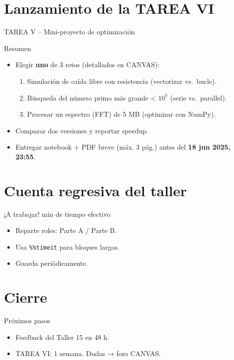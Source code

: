 \documentclass[10pt]{beamer}
\begin{document}
\section{Lanzamiento de la TAREA VI}
\begin{frame}{TAREA V -- Mini-proyecto de optimización}
\begin{block}{Resumen}
  \begin{itemize}
    \item Elegir \textbf{uno} de 3 retos (detallados en CANVAS):  
      \begin{enumerate}
        \item Simulación de caída libre con resistencia (vectorizar vs.\ bucle).  
        \item Búsqueda del número primo más grande < 10\(^7\) (serie vs.\ parallel).  
        \item Procesar un espectro (FFT) de 5 MB (optimizar con NumPy).  
      \end{enumerate}
    \item Comparar dos versiones y reportar speedup.  
    \item Entregar notebook + PDF breve (máx. 3 pág.) antes del \textbf{18 jun 2025, 23:55}.  
  \end{itemize}
\end{block}
\end{frame}

\section{Cuenta regresiva del taller}
\begin{frame}{¡A trabajar!}
\Large{ min de tiempo efectivo}\\[0.4cm]
\begin{itemize}
  \item Reparte roles: Parte A / Parte B.  
  \item Usa \texttt{\%\%timeit} para bloques largos.  
  \item Guarda periódicamente.
\end{itemize}
\end{frame}

\section{Cierre}
\begin{frame}{Próximos pasos}
\begin{itemize}
  \item Feedback del Taller 15 en 48 h.  
  \item TAREA VI: 1 semana. Dudas → foro CANVAS.  
\end{itemize}
\end{frame}
\end{document}
